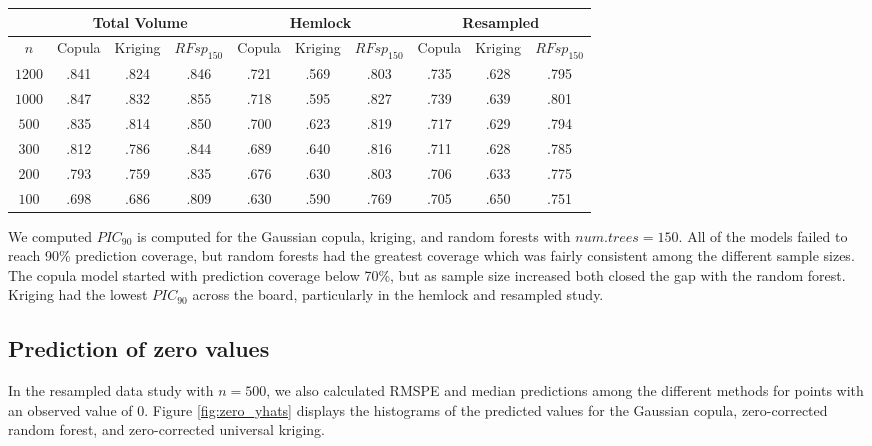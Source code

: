 \documentclass{article}
\begin{document}
\begin{center}
\begin{singlespace}
\begin{tabular}{|| c | c c c | c c c | c c c ||}
\hline
\multirow{2}{*}{} &
\multicolumn{3}{c}{Total Volume} &
\multicolumn{3}{c}{Hemlock} &
\multicolumn{3}{c||}{Resampled} \\
\hline
$n$ & Copula & Kriging & $RFsp_{150}$ & Copula & Kriging & $RFsp_{150}$ & Copula & Kriging & $RFsp_{150}$ \\ [.5ex]
\hline\hline
$1200$ & .841 & \cellcolor{gray}.824 & \cellcolor{cyan}.846 & .721 &\cellcolor{gray}.569 &\cellcolor{cyan} .803 &.735 &\cellcolor{gray}.628 & \cellcolor{cyan}.795 \\
$1000$ & .847 &\cellcolor{gray}.832 &\cellcolor{cyan} .855 &.718 &\cellcolor{gray}.595 &\cellcolor{cyan} .827 &.739 &\cellcolor{gray}.639 & \cellcolor{cyan}.801 \\
$500$ & .835 &\cellcolor{gray}.814 &\cellcolor{cyan} .850 & .700 &\cellcolor{gray}.623 &\cellcolor{cyan} .819 &.717 &\cellcolor{gray}.629 & \cellcolor{cyan}.794 \\
$300$ & .812 &\cellcolor{gray}.786 &\cellcolor{cyan} .844 & .689 &\cellcolor{gray}.640 &\cellcolor{cyan} .816 &.711 & \cellcolor{gray}.628 & \cellcolor{cyan}.785 \\
$200$ & .793 &\cellcolor{gray}.759 &\cellcolor{cyan} .835 & .676 &\cellcolor{gray}.630 &\cellcolor{cyan} .803 &.706 &\cellcolor{gray}.633 & \cellcolor{cyan}.775 \\
$100$ & .698 &\cellcolor{gray}.686 &\cellcolor{cyan} .809 & .630 &\cellcolor{gray}.590 &\cellcolor{cyan} .769 &.705 &\cellcolor{gray}.650 & \cellcolor{cyan}.751 \\ [.5ex] 
\hline
\end{tabular}
\end{singlespace}
\end{center}

We computed $PIC_{90}$ is computed for the Gaussian copula, kriging, and random forests with $num.trees=150$.
All of the models failed to reach 90\% prediction coverage, but random forests had the greatest coverage which was fairly consistent among the different sample sizes.
The copula model started with prediction coverage below 70\%, but as sample size increased both closed the gap with the random forest.
Kriging had the lowest $PIC_{90}$ across the board, particularly in the hemlock and resampled study.

\subsection{Prediction of zero values}
In the resampled data study with $n = 500$, we also calculated RMSPE and median predictions among the different methods for points with an observed value of 0.
Figure \ref{fig:zero_yhats} displays the histograms of the predicted values for the Gaussian copula, zero-corrected random forest, and zero-corrected universal kriging. 
\end{document}
